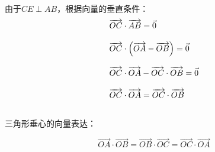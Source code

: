 \documentclass[UTF8]{ctexart}
\let\nvec\vec
\def\vec#1{\nvec{\vphantom b\smash{#1}}}
\begin{document}
    由于$CE\perp AB$，根据向量的垂直条件：\vspace{5pt}
    \begin{align}
        &\overrightarrow{OC}\cdot\overrightarrow{AB}=\vec{0}\\[3mm]
        &\overrightarrow{OC}\cdot\left(\overrightarrow{OA}-\overrightarrow{OB}\right)=\vec{0}\\[3mm]
        &\overrightarrow{OC}\cdot\overrightarrow{OA}-\overrightarrow{OC}\cdot\overrightarrow{OB}=\vec{0}\\[3mm]
        &\overrightarrow{OC}\cdot\overrightarrow{OA}=\overrightarrow{OC}\cdot\overrightarrow{OB}
    \end{align}\\
    三角形垂心的向量表达：
    \begin{large}
        \begin{equation*}
            \overrightarrow{OA}\cdot\overrightarrow{OB}=\overrightarrow{OB}\cdot\overrightarrow{OC}=\overrightarrow{OC}\cdot\overrightarrow{OA}
        \end{equation*}
    \end{large}

\newpage
\end{document}
